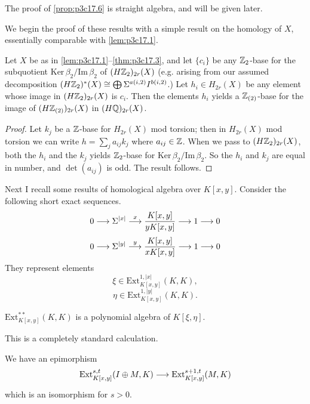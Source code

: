 \documentclass[../main]{subfiles}
\begin{document}
The proof of \ref{prop:p3c17.6} is straight algebra, and will be given later.

We begin the proof of these results with a simple result on the homology of $X$, essentially comparable with \ref{lem:p3c17.1}. 

\begin{lemma}
\label{lem:p3c17.7}
Let $X$ be as in \ref{lem:p3c17.1}--\ref{thm:p3c17.3}, and let $\{c_i\}$ be any $\mathbb{Z}_2$-base for the subquotient $\mathrm{Ker} \, \beta_2/\mathrm{Im} \, \beta_2$ of $(H\mathbb{Z}_2)_{2r}(X)$ (e.g. arising from our assumed decomposition $(H \mathbb{Z}_2)^\ast(X) \cong \bigoplus \Sigma^{a(i, 2)} I^{b(i, 2)}$.) Let $h_i \in H_{2r}(X)$ be any element whose image in $(H \mathbb{Z}_2)_{2r}(X)$ is $c_i$. Then the elements $h_i$ yields a $\mathbb{Z}_{(2)}$-base for the image of $(H \mathbb{Z}_{(2)})_{2r}(X)$ in $(H \mathbb{Q})_{2r}(X)$.
\end{lemma}

\begin{proof}
Let $k_j$ be a $\mathbb{Z}$-base for $H_{2r}(X)$ mod torsion; then in $H_{2r}(X)$ mod torsion we can write $\displaystyle h = \sum_j a_{ij} k_j$ where $a_{ij} \in \mathbb{Z}$. When we pass to $(H \mathbb{Z}_2)_{2r}(X)$, both the $h_i$ and the $k_j$ yields $\mathbb{Z}_2$-base for $\mathrm{Ker} \, \beta_2/\mathrm{Im} \, \beta_2$. So the $h_i$ and $k_j$ are equal in number, and $\det(a_{ij})$ is odd. The result follows.
\end{proof}

Next I recall some results of homological algebra over $K[x, y]$. Consider the following short exact sequences. \[0 \lar{} \Sigma^{|x|} \lar{x} \frac {K[x, y]} {y K[x, y]} \lar{} 1 \lar{} 0\] \[0 \lar{} \Sigma^{|y|} \lar{y} \frac {K[x, y]} {x K[x, y]} \lar{} 1 \lar{} 0\] They represent elements \[\xi \in \mathrm{Ext}_{K[x, y]}^{1, |x|} (K, K),\] \[\eta \in \mathrm{Ext}_{K[x, y]}^{1, |y|} (K, K).\]

\begin{lemma}
\label{lem:p3c17.8}
$\mathrm{Ext}_{K[x, y]}^{\ast \ast}(K, K)$ is a polynomial algebra of $K[\xi, \eta]$.
\end{lemma}

This is a completely standard calculation.

\begin{lemma}
\label{lem:p3c17.9}
We have an epimorphism \[\mathrm{Ext}_{K[x, y]}^{s, t} (I \oplus M, K) \lar{} \mathrm{Ext}_{K[x, y]}^{s + 1, t}(M, K)\] which is an isomorphism for $s > 0$. 
\end{lemma}
\end{document}
